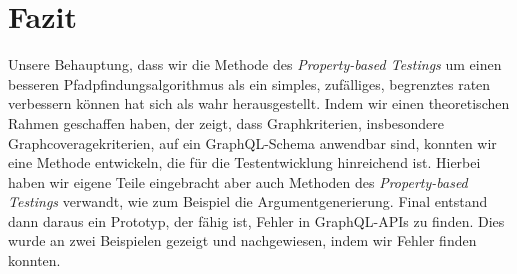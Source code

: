 \chapter{Fazit}
\label{fazit}

Unsere Behauptung, dass wir die Methode des \textit{Property-based Testings} um einen besseren Pfadpfindungsalgorithmus
als ein simples, zufälliges, begrenztes raten verbessern können hat sich als wahr herausgestellt.
Indem wir einen theoretischen Rahmen geschaffen haben, der zeigt, dass Graphkriterien, insbesondere Graphcoveragekriterien,
auf ein GraphQL-Schema anwendbar sind, konnten wir eine Methode entwickeln, die für die Testentwicklung hinreichend ist.
Hierbei haben wir eigene Teile eingebracht aber auch Methoden des \textit{Property-based Testings} verwandt, wie zum Beispiel die Argumentgenerierung.
Final entstand dann daraus ein Prototyp, der fähig ist, Fehler in GraphQL-APIs zu finden.
Dies wurde an zwei Beispielen gezeigt und nachgewiesen, indem wir Fehler finden konnten.

